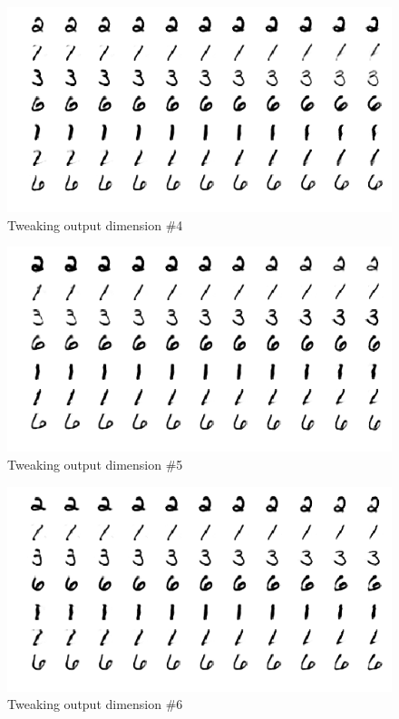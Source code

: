 \documentclass[10pt,twocolumn,letterpaper]{article}
\begin{document}
\begin{figure}[ht]
	\includegraphics[width=\columnwidth]{j4}
	\caption{Tweaking output dimension \#4}
\end{figure}
\begin{figure}[ht]
	\includegraphics[width=\columnwidth]{j5}
	\caption{Tweaking output dimension \#5}
\end{figure}
\begin{figure}[ht]
	\includegraphics[width=\columnwidth]{j6}
	\caption{Tweaking output dimension \#6}
\end{figure}
\end{document}
